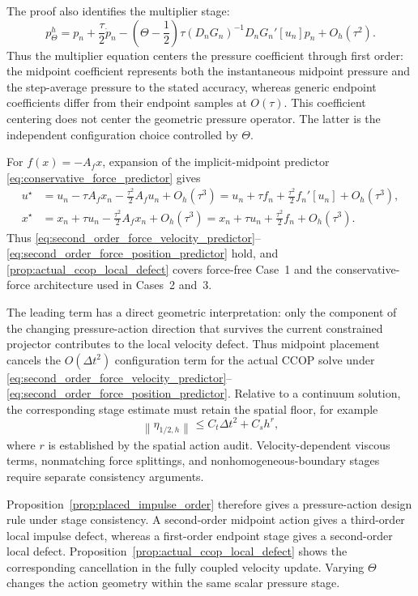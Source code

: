 \documentclass[11pt]{article}
\theoremstyle{plain}
\theoremstyle{definition}
\theoremstyle{remark}
\newcommand{\dt}{\Delta t}
\newcommand{\Th}{\Theta}
\newcommand{\norm}[2][]{\left\lVert #2\right\rVert_{#1}}
\begin{document}
The proof also identifies the multiplier stage:
\begin{equation}
 p_\Th^h
 =p_n+\frac{\tau}{2}\dot p_n
  -\left(\Th-\frac12\right)\tau
   (D_nG_n)^{-1}D_nG_n'[u_n]p_n
  +O_h(\tau^2).
 \label{eq:actual_ccop_multiplier_stage}
\end{equation}
Thus the multiplier equation centers the pressure coefficient through first
order: the midpoint coefficient represents both the instantaneous midpoint
pressure and the step-average pressure to the stated accuracy, whereas generic
endpoint coefficients differ from their endpoint samples at $O(\tau)$.  This
coefficient centering does not center the geometric pressure operator.  The
latter is the independent configuration choice controlled by $\Th$.

For $f(x)=-A_fx$, expansion of the implicit-midpoint predictor
\eqref{eq:conservative_force_predictor} gives
\begin{align*}
 u^\star
 &=u_n-\tau A_fx_n-\frac{\tau^2}{2}A_fu_n+O_h(\tau^3)
  =u_n+\tau f_n+\frac{\tau^2}{2}f_n'[u_n]+O_h(\tau^3),\\
 x^\star
 &=x_n+\tau u_n-\frac{\tau^2}{2}A_fx_n+O_h(\tau^3)
  =x_n+\tau u_n+\frac{\tau^2}{2}f_n+O_h(\tau^3).
\end{align*}
Thus \eqref{eq:second_order_force_velocity_predictor}--
\eqref{eq:second_order_force_position_predictor} hold, and
\cref{prop:actual_ccop_local_defect} covers force-free Case~1 and the
conservative-force architecture used in Cases~2 and~3.

The leading term has a direct geometric interpretation: only the component of
the changing pressure-action direction that survives the current constrained
projector contributes to the local velocity defect.  Thus midpoint placement
cancels the $O(\dt^2)$ configuration term for the actual CCOP solve under
\eqref{eq:second_order_force_velocity_predictor}--
\eqref{eq:second_order_force_position_predictor}.  Relative to
a continuum solution, the corresponding stage estimate must retain the
spatial floor, for example
\begin{equation}
 \norm{\eta_{1/2,h}}
 \le C_t\dt^2+C_sh^r,
 \label{eq:space_time_stage_floor}
\end{equation}
where $r$ is established by the spatial action audit.  Velocity-dependent
viscous terms, nonmatching force splittings, and nonhomogeneous-boundary stages
require separate consistency arguments.

Proposition~\ref{prop:placed_impulse_order} therefore gives a pressure-action
design rule under stage consistency.  A second-order midpoint action gives a
third-order local impulse defect, whereas a first-order endpoint stage gives a
second-order local defect.  Proposition~\ref{prop:actual_ccop_local_defect}
shows the corresponding cancellation in the fully coupled velocity update.
Varying $\Th$ changes the action geometry within the same scalar pressure
stage.
\end{document}
